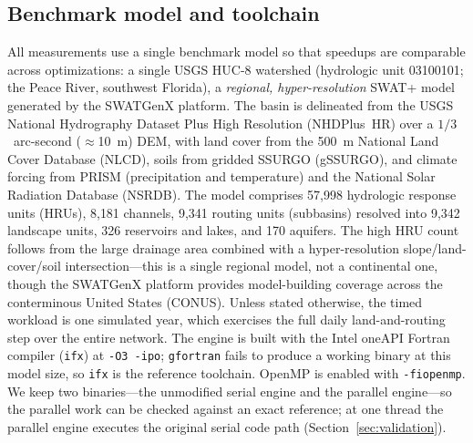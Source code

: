 \subsection{Benchmark model and toolchain}\label{sec:model}
All measurements use a single benchmark model so that speedups are comparable across
optimizations: a single USGS HUC-8 watershed (hydrologic unit 03100101; the Peace River, southwest Florida), a
\emph{regional, hyper-resolution} SWAT+ model generated by the SWATGenX platform. The basin is
delineated from the USGS National Hydrography Dataset Plus High Resolution (NHDPlus~HR) over a
$1/3$~arc-second ($\approx$10~m) DEM, with land cover from the 500~m National Land Cover Database
(NLCD), soils from gridded SSURGO (gSSURGO), and climate forcing from PRISM (precipitation and
temperature) and the National Solar Radiation Database (NSRDB). The model comprises
57{,}998 hydrologic response units (HRUs), 8{,}181 channels, 9{,}341 routing units
(subbasins) resolved into 9{,}342 landscape units, 326 reservoirs and lakes, and 170 aquifers.
The high HRU count follows from the large drainage area combined with a hyper-resolution
slope/land-cover/soil intersection---this is a single regional model, not a continental one,
though the SWATGenX platform provides model-building coverage across the conterminous United
States (CONUS). Unless stated otherwise, the timed workload is one simulated year, which exercises
the full daily land-and-routing step over the entire network. The engine is built with the Intel
oneAPI Fortran compiler (\texttt{ifx}) at \texttt{-O3 -ipo}; \texttt{gfortran} fails to produce a
working binary at this model size, so \texttt{ifx} is the reference toolchain. OpenMP is enabled
with \texttt{-fiopenmp}. We keep two binaries---the unmodified serial engine and the parallel
engine---so the parallel work can be checked against an exact reference; at one thread the
parallel engine executes the original serial code path (Section~\ref{sec:validation}).

